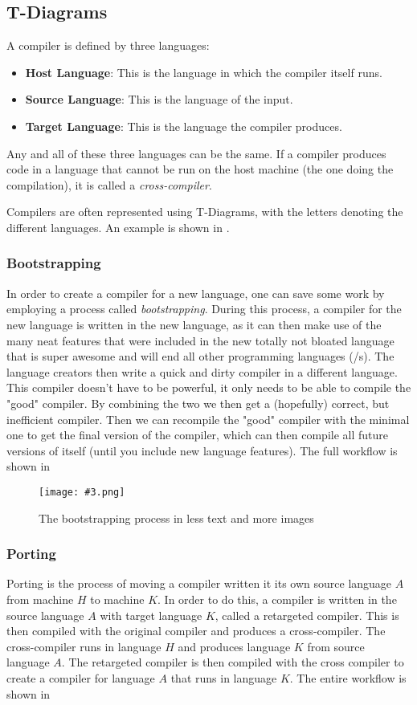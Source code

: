\documentclass{article}
\newcommand{\fig}[4]{
	\begin{figure}[#1]
		\center
		\texttt{[image: \#3.png]}
		\caption{#4}
		\label{fig:#3}
	\end{figure}
	}
\begin{document}
\subsection{T-Diagrams}
A compiler is defined by three languages:
\begin{itemize}
	\item \textbf{Host Language}: This is the language in which the compiler itself runs.
	\item \textbf{Source Language}: This is the language of the input.
	\item \textbf{Target Language}: This is the language the compiler produces.
\end{itemize}

Any and all of these three languages can be the same.
If a compiler produces code in a language that cannot be run on the host machine (the one doing the compilation), it is called a \emph{cross-compiler}.

Compilers are often represented using T-Diagrams, with the letters denoting the different languages.
An example is shown in .

\subsubsection{Bootstrapping}
In order to create a compiler for a new language, one can save some work by employing a process called \emph{bootstrapping}.
During this process, a compiler for the new language is written in the new language, as it can then make use of the many neat features that were included in the new totally not bloated language that is super awesome and will end all other programming languages (/s).
The language creators then write a quick and dirty compiler in a different language.
This compiler doesn't have to be powerful, it only needs to be able to compile the "good" compiler.
By combining the two we then get a (hopefully) correct, but inefficient compiler.
Then we can recompile the "good" compiler with the minimal one to get the final version of the compiler, which can then compile all future versions of itself (until you include new language features).
The full workflow is shown in 

\fig{h}{}{bootstrapping}{The bootstrapping process in less text and more images}

\subsubsection{Porting}
Porting is the process of moving a compiler written it its own source language $A$ from machine $H$ to machine $K$.
In order to do this, a compiler is written in the source language $A$ with target language $K$, called a retargeted compiler.
This is then compiled with the original compiler and produces a cross-compiler.
The cross-compiler runs in language $H$ and produces language $K$ from source language $A$.
The retargeted compiler is then compiled with the cross compiler to create a compiler for language $A$ that runs in language $K$.
The entire workflow is shown in 
\end{document}
